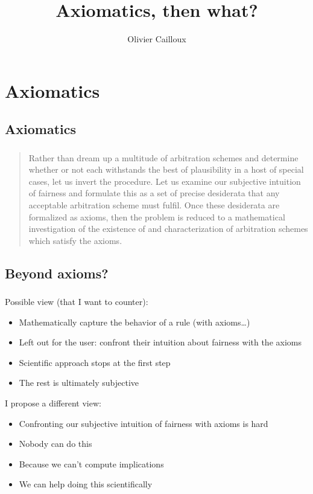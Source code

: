 \documentclass[french,english]{beamer}
\title{Axiomatics, then what?}
\author{Olivier Cailloux}
\institute[LAMSADE]{LAMSADE, Université Paris-Dauphine}
\date{\formatdate{30}{1}{2017}}
\begin{document}
\begin{frame}[plain]
	\titlepage
\end{frame}
\addtocounter{framenumber}{-1}

\section{Axiomatics}
\subsection{Axiomatics}
\begin{frame}
	\frametitle{\subsecname}
	\begin{quote}
		Rather than dream up a multitude of arbitration schemes and determine whether or not each withstands the best of plausibility in a host of special cases, let us invert the procedure. Let us examine our subjective intuition of fairness and formulate this as a set of precise desiderata that any acceptable arbitration scheme must fulfil. Once these desiderata are formalized as axioms, then the problem is reduced to a mathematical investigation of the existence of and characterization of arbitration schemes which satisfy the axioms.
	\end{quote}
	\citet[p. 121]{luce_games_1957}
\end{frame}

\subsection{Beyond axioms?}
\begin{frame}
	\frametitle{\subsecname}
	Possible view (that I want to counter):
	\begin{itemize}
		\item Mathematically capture the behavior of a rule (with axioms…)
		\item Left out for the user: confront their intuition about fairness with the axioms
		\item Scientific approach stops at the first step
		\item The rest is ultimately subjective
	\end{itemize}
	I propose a different view: 
	\begin{itemize}
		\item Confronting our subjective intuition of fairness with axioms is hard
		\item Nobody can do this
		\item Because we can’t compute implications
		\item We can help doing this scientifically
	\end{itemize}
\end{frame}
\end{document}
